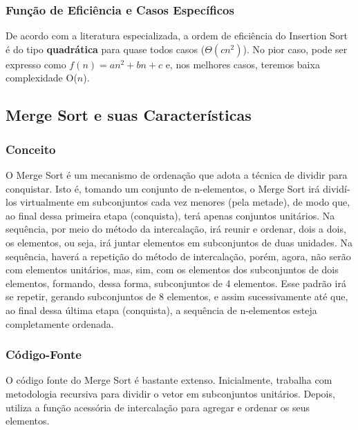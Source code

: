 \documentclass[a4paper, 12pt]{article}
\begin{document}
\subsubsection{Função de Eficiência e Casos Específicos}
\tab{ }De acordo com a literatura especializada, a ordem de eficiência do Insertion Sort é do tipo \textbf{quadrática} para quase todos casos ($\varTheta(cn^2)$). No pior caso, pode ser expresso como $f(n) = an^{2} + bn + c$ e, nos melhores casos, teremos baixa complexidade O($n$).

\vspace{0.9cm}
\subsection{Merge Sort e suas Características}
\subsubsection{Conceito}

\tab{ }O Merge Sort é um mecanismo de ordenação que adota a técnica de dividir para conquistar. Isto é, tomando um conjunto de n-elementos, o Merge Sort irá dividí-los virtualmente em subconjuntos cada vez menores (pela metade), de modo que, ao final dessa primeira etapa (conquista), terá apenas conjuntos unitários. Na sequência, por meio do método da intercalação, irá reunir e ordenar, dois a dois, os elementos, ou seja, irá juntar elementos em subconjuntos de duas unidades. Na sequência, haverá a repetição do método de intercalação, porém, agora, não serão com elementos unitários, mas, sim, com os elementos dos subconjuntos de dois elementos, formando, dessa forma, subconjuntos de 4 elementos. Esse padrão irá se repetir, gerando subconjuntos de 8 elementos, e assim sucessivamente até que, ao final dessa última etapa (conquista), a sequência de n-elementos esteja completamente ordenada.

\subsubsection{Código-Fonte}
\tab{ }O código fonte do Merge Sort é bastante extenso. Inicialmente, trabalha com metodologia recursiva para dividir o vetor em subconjuntos unitários. Depois, utiliza a função acessória de intercalação para agregar e ordenar os seus elementos.
\end{document}
